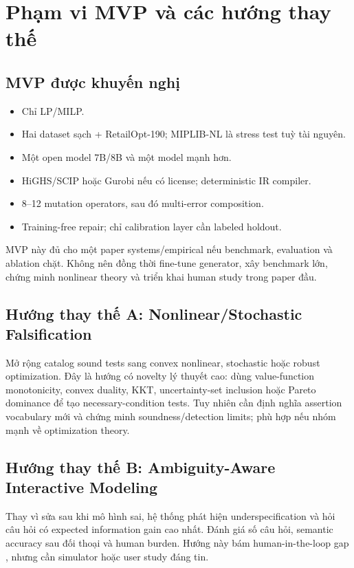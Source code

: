 \documentclass[11pt,a4paper]{article}
\begin{document}
\section{Phạm vi MVP và các hướng thay thế}

\subsection{MVP được khuyến nghị}

\begin{itemize}
  \item Chỉ LP/MILP.
  \item Hai dataset sạch + RetailOpt-190; MIPLIB-NL là stress test tuỳ tài nguyên.
  \item Một open model 7B/8B và một model mạnh hơn.
  \item HiGHS/SCIP hoặc Gurobi nếu có license; deterministic IR compiler.
  \item 8--12 mutation operators, sau đó multi-error composition.
  \item Training-free repair; chỉ calibration layer cần labeled holdout.
\end{itemize}

MVP này đủ cho một paper systems/empirical nếu benchmark, evaluation và ablation chặt. Không nên đồng thời fine-tune generator, xây benchmark lớn, chứng minh nonlinear theory và triển khai human study trong paper đầu.

\subsection{Hướng thay thế A: Nonlinear/Stochastic Falsification}

Mở rộng catalog sound tests sang convex nonlinear, stochastic hoặc robust optimization. Đây là hướng có novelty lý thuyết cao: dùng value-function monotonicity, convex duality, KKT, uncertainty-set inclusion hoặc Pareto dominance để tạo necessary-condition tests. Tuy nhiên cần định nghĩa assertion vocabulary mới và chứng minh soundness/detection limits; phù hợp nếu nhóm mạnh về optimization theory.

\subsection{Hướng thay thế B: Ambiguity-Aware Interactive Modeling}

Thay vì sửa sau khi mô hình sai, hệ thống phát hiện underspecification và hỏi câu hỏi có expected information gain cao nhất. Đánh giá số câu hỏi, semantic accuracy sau đối thoại và human burden. Hướng này bám human-in-the-loop gap \parencite{xiao2025survey}, nhưng cần simulator hoặc user study đáng tin.
\end{document}
